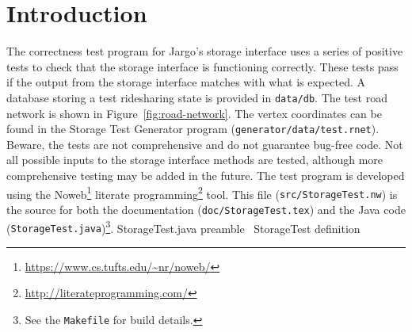 \documentclass{article}
\def\nwendcode{\endtrivlist \endgroup}
\let\nwdocspar=\par
\begin{document}
\section{Introduction}
\label{sec:introduction}
The correctness test program for Jargo's storage interface uses a series of
positive tests to check that the storage interface is functioning correctly.
These tests pass if the output from the storage interface matches with what is
expected. A database storing a test ridesharing state is provided in
{\tt{}data/db}.  The test road network is shown in
Figure~\ref{fig:road-network}.  The vertex coordinates can be found in the
Storage Test Generator program ({\tt{}generator/data/test.rnet}).  Beware, the
tests are not comprehensive and do not guarantee bug-free code. Not all
possible inputs to the storage interface methods are tested, although more
comprehensive testing may be added in the future.  The test program is
developed using the Noweb\footnote{\url{https://www.cs.tufts.edu/~nr/noweb/}}
literate programming\footnote{\url{http://literateprogramming.com/}} tool.
This file ({\tt{}src/StorageTest.nw}) is the source for both the documentation
({\tt{}doc/StorageTest.tex}) and the Java code ({\tt{}StorageTest.java})\footnote{See
the {\tt{}Makefile} for build details.}.
\endmoddef{}
\LA{}StorageTest.java preamble~{\nwtagstyle{}}\RA{}
\LA{}\code{}StorageTest\edoc{} definition~{\nwtagstyle{}}\RA{}
\nwendcode{}\nwdocspar
\end{document}
